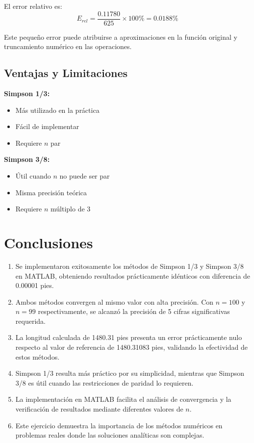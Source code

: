 \documentclass[conference]{IEEEtran}
\begin{document}
El error relativo es:
\begin{equation}
E_{rel} = \frac{0.11780}{625} \times 100\% = 0.0188\%
\end{equation}

Este pequeño error puede atribuirse a aproximaciones en la función original y truncamiento numérico en las operaciones.

\subsection{Ventajas y Limitaciones}

\textbf{Simpson 1/3:}
\begin{itemize}
    \item Más utilizado en la práctica
    \item Fácil de implementar
    \item Requiere $n$ par
\end{itemize}

\textbf{Simpson 3/8:}
\begin{itemize}
    \item Útil cuando $n$ no puede ser par
    \item Misma precisión teórica
    \item Requiere $n$ múltiplo de 3
\end{itemize}

\section{Conclusiones}

\begin{enumerate}
    \item Se implementaron exitosamente los métodos de Simpson 1/3 y Simpson 3/8 en MATLAB, obteniendo resultados prácticamente idénticos con diferencia de 0.00001 pies.

    \item Ambos métodos convergen al mismo valor con alta precisión. Con $n=100$ y $n=99$ respectivamente, se alcanzó la precisión de 5 cifras significativas requerida.

    \item La longitud calculada de 1480.31 pies presenta un error prácticamente nulo respecto al valor de referencia de 1480.31083 pies, validando la efectividad de estos métodos.

    \item Simpson 1/3 resulta más práctico por su simplicidad, mientras que Simpson 3/8 es útil cuando las restricciones de paridad lo requieren.

    \item La implementación en MATLAB facilita el análisis de convergencia y la verificación de resultados mediante diferentes valores de $n$.

    \item Este ejercicio demuestra la importancia de los métodos numéricos en problemas reales donde las soluciones analíticas son complejas.
\end{enumerate}
\end{document}
